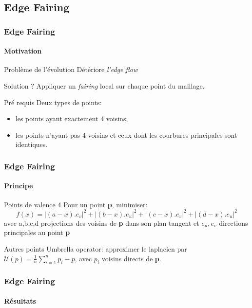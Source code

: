\documentclass[9pt]{beamer}
\begin{document}
\subsection{Edge Fairing}

\begin{frame}
	\frametitle{Edge Fairing}
	\framesubtitle{Motivation}
	
	\begin{block}{Problème de l'évolution}
		Détériore \textit{l'edge flow}
	\end{block}
	
	\begin{block}{Solution ?}
		Appliquer un \textit{fairing} local sur chaque point du maillage.
	\end{block}
	
	\begin{block}{Pré requis}
		Deux types de points:
		\begin{itemize}
			\item les points ayant exactement 4 voisins;
			\item les points n'ayant pas 4 voisins et ceux dont les courbures principales sont identiques.
		\end{itemize}
	\end{block}
\end{frame}

\begin{frame}
	\frametitle{Edge Fairing}
	\framesubtitle{Principe}
	
	\begin{block}{Points de valence 4}
		Pour un point \textbf{p}, minimiser:
		\begin{equation*}
			f(x) = |(a-x).e_v|^2 + |(b-x).e_u|^2 + |(c-x).e_v|^2 + |(d-x).e_u|^2
		\end{equation*}
		avec a,b,c,d projections des voisins de \textbf{p} dans son plan tangent et $e_u, e_v$ directions principales au point 				\textbf{p}
	\end{block}
	
	\begin{block}{Autres points}
		Umbrella operator: approximer le laplacien par $\mathcal{U}(p) = \displaystyle \frac{1}{n} \sum \limits_{i=1}^{n} p_i - p$, avec $p_i$ voisins directs de \textbf{p}.
	\end{block}
\end{frame}

\begin{frame}
	\frametitle{Edge Fairing}
	\framesubtitle{Résultats}
	
\end{frame}






\end{document}
